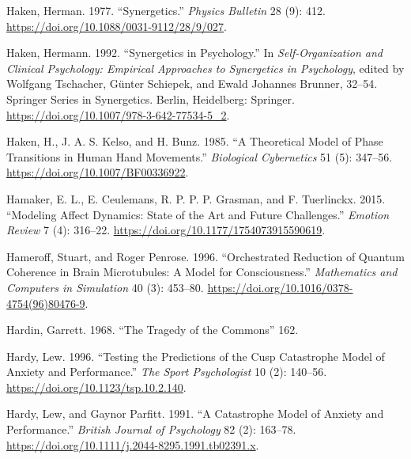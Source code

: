 \documentclass[
  a4paper,
  DIV=11,
  numbers=noendperiod,
  oneside]{scrreprt}
\newlength{\cslhangindent}
\newlength{\cslentryspacingunit} %
\newenvironment{CSLReferences}[2] %
 {%
  \setlength{\parindent}{0pt}
  \ifodd #1
  \let\oldpar\par
  \def\par{\hangindent=\cslhangindent\oldpar}
  \fi
  \setlength{\parskip}{#2\cslentryspacingunit}
 }%
 {}
\begin{document}
\begin{CSLReferences}{1}{0}
\leavevmode{}%
Haken, Herman. 1977. {``Synergetics.''} \emph{Physics Bulletin} 28 (9):
412. \url{https://doi.org/10.1088/0031-9112/28/9/027}.

\leavevmode{}%
Haken, Hermann. 1992. {``Synergetics in {Psychology}.''} In
\emph{Self-{Organization} and {Clinical Psychology}: {Empirical
Approaches} to {Synergetics} in {Psychology}}, edited by Wolfgang
Tschacher, Günter Schiepek, and Ewald Johannes Brunner, 32--54. Springer
{Series} in {Synergetics}. {Berlin, Heidelberg}: {Springer}.
\url{https://doi.org/10.1007/978-3-642-77534-5_2}.

\leavevmode{}%
Haken, H., J. A. S. Kelso, and H. Bunz. 1985. {``A Theoretical Model of
Phase Transitions in Human Hand Movements.''} \emph{Biological
Cybernetics} 51 (5): 347--56. \url{https://doi.org/10.1007/BF00336922}.

\leavevmode{}%
Hamaker, E. L., E. Ceulemans, R. P. P. P. Grasman, and F. Tuerlinckx.
2015. {``Modeling {Affect Dynamics}: {State} of the {Art} and {Future
Challenges}.''} \emph{Emotion Review} 7 (4): 316--22.
\url{https://doi.org/10.1177/1754073915590619}.

\leavevmode{}%
Hameroff, Stuart, and Roger Penrose. 1996. {``Orchestrated Reduction of
Quantum Coherence in Brain Microtubules: {A} Model for Consciousness.''}
\emph{Mathematics and Computers in Simulation} 40 (3): 453--80.
\url{https://doi.org/10.1016/0378-4754(96)80476-9}.

\leavevmode{}%
Hardin, Garrett. 1968. {``The {Tragedy} of the {Commons}''} 162.

\leavevmode{}%
Hardy, Lew. 1996. {``Testing the {Predictions} of the {Cusp Catastrophe
Model} of {Anxiety} and {Performance}.''} \emph{The Sport Psychologist}
10 (2): 140--56. \url{https://doi.org/10.1123/tsp.10.2.140}.

\leavevmode{}%
Hardy, Lew, and Gaynor Parfitt. 1991. {``A Catastrophe Model of Anxiety
and Performance.''} \emph{British Journal of Psychology} 82 (2):
163--78. \url{https://doi.org/10.1111/j.2044-8295.1991.tb02391.x}.


\end{CSLReferences}
\end{document}
